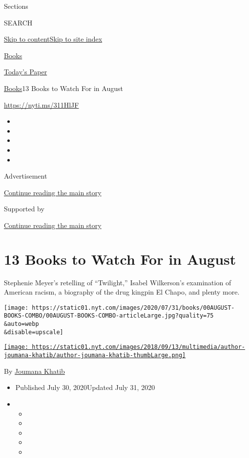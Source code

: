 Sections

SEARCH

\protect\hyperlink{site-content}{Skip to
content}\protect\hyperlink{site-index}{Skip to site index}

\href{https://www.nytimes.com/section/books}{Books}

\href{https://myaccount.nytimes.com/auth/login?response_type=cookie\&client_id=vi}{}

\href{https://www.nytimes.com/section/todayspaper}{Today's Paper}

\href{/section/books}{Books}\textbar{}13 Books to Watch For in August

\url{https://nyti.ms/311HlJF}

\begin{itemize}
\item
\item
\item
\item
\item
\end{itemize}

Advertisement

\protect\hyperlink{after-top}{Continue reading the main story}

Supported by

\protect\hyperlink{after-sponsor}{Continue reading the main story}

\hypertarget{13-books-to-watch-for-in-august}{%
\section{13 Books to Watch For in
August}\label{13-books-to-watch-for-in-august}}

Stephenie Meyer's retelling of ``Twilight,'' Isabel Wilkerson's
examination of American racism, a biography of the drug kingpin El
Chapo, and plenty more.

\texttt{[image: https://static01.nyt.com/images/2020/07/31/books/00AUGUST-BOOKS-COMBO/00AUGUST-BOOKS-COMBO-articleLarge.jpg?quality=75\\\&auto=webp\\\&disable=upscale]}

\href{https://nytimes.com/by/joumana-khatib}{\texttt{[image: https://static01.nyt.com/images/2018/09/13/multimedia/author-joumana-khatib/author-joumana-khatib-thumbLarge.png]}}

By \href{https://nytimes.com/by/joumana-khatib}{Joumana Khatib}

\begin{itemize}
\item
  Published July 30, 2020Updated July 31, 2020
\item
  \begin{itemize}
  \item
  \item
  \item
  \item
  \item
  \end{itemize}
\end{itemize}

